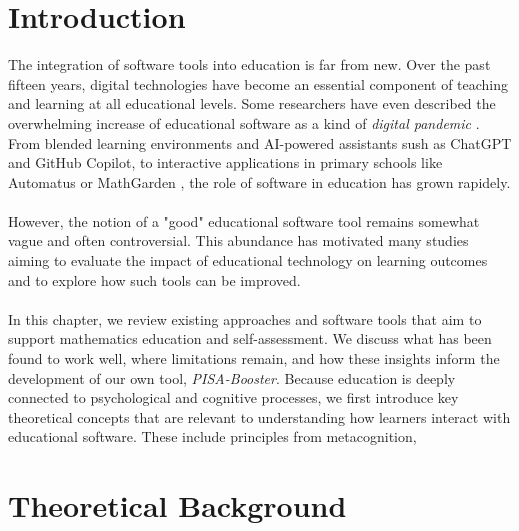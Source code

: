 \section{Introduction}
The integration of software tools into education is far from new. Over the past fifteen years, digital technologies have become an essential component of teaching and learning at all educational levels.
Some researchers have even described the overwhelming increase of educational software as a kind of \textit{digital pandemic} \cite{dancsa_digital_2023}.
From blended learning environments and AI-powered assistants sush as ChatGPT and GitHub Copilot, to interactive applications in primary schools like Automatus \cite{automatus} or MathGarden \cite{rekentuin}, the role of software in education has grown rapidely. \\ \\
However, the notion of a "good" educational software tool remains somewhat vague and often controversial. 
This abundance has motivated many studies aiming to evaluate the impact of educational technology on learning outcomes and to explore how such tools can be improved. \\ \\
In this chapter, we review existing approaches and software tools that aim to support mathematics education and self-assessment. 
We discuss what has been found to work well, where limitations remain, and how these insights inform the development of our own tool, \textit{PISA-Booster}. 
Because education is deeply connected to psychological and cognitive processes, we first introduce key theoretical concepts that are relevant to understanding how learners interact with educational software.
These include principles from metacognition, 

\section{Theoretical Background}
